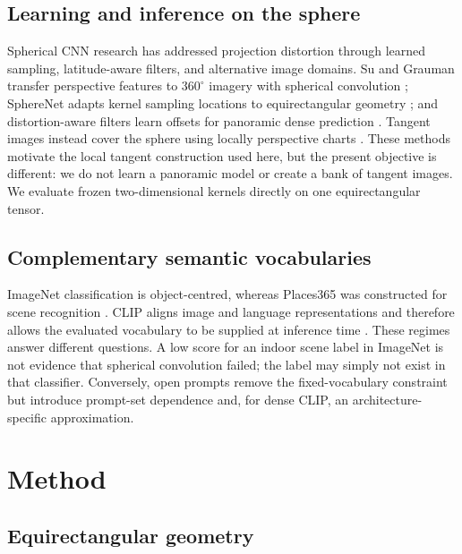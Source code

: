 \documentclass{isprs}
\begin{document}
\subsection{Learning and inference on the sphere}

Spherical CNN research has addressed projection distortion through learned
sampling, latitude-aware filters, and alternative image domains.  Su and
Grauman transfer perspective features to $360^\circ$ imagery with spherical
convolution \cite{su2017spherical}; SphereNet adapts kernel sampling locations
to equirectangular geometry \cite{coors2018spherenet}; and distortion-aware
filters learn offsets for panoramic dense prediction
\cite{tateno2018distortion}.  Tangent images instead cover the sphere using
locally perspective charts \cite{eder2020tangent}.  These methods motivate the
local tangent construction used here, but the present objective is different:
we do not learn a panoramic model or create a bank of tangent images.  We
evaluate frozen two-dimensional kernels directly on one equirectangular tensor.

\subsection{Complementary semantic vocabularies}

ImageNet classification is object-centred, whereas Places365 was constructed
for scene recognition \cite{deng2009imagenet,zhou2018places}.  CLIP aligns image
and language representations and therefore allows the evaluated vocabulary to
be supplied at inference time \cite{radford2021clip}.  These regimes answer
different questions.  A low score for an indoor scene label in ImageNet is not
evidence that spherical convolution failed; the label may simply not exist in
that classifier.  Conversely, open prompts remove the fixed-vocabulary
constraint but introduce prompt-set dependence and, for dense CLIP, an
architecture-specific approximation.

\section{Method}

\subsection{Equirectangular geometry}
\end{document}

